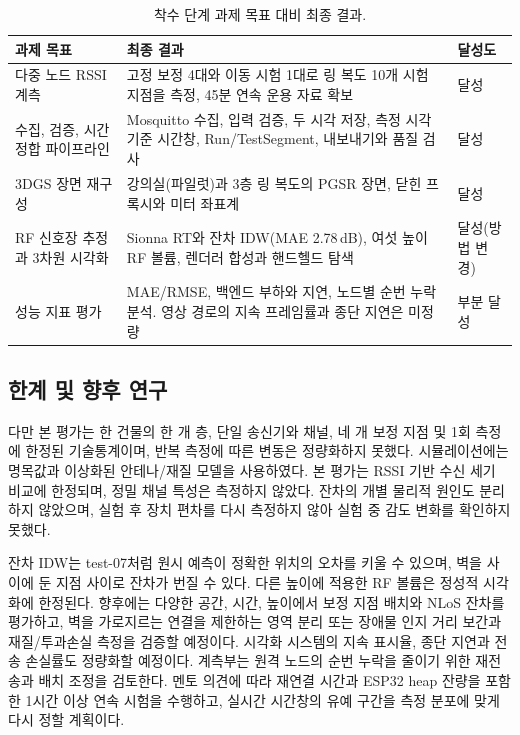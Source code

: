 \documentclass[11pt,a4paper]{article}
\begin{document}
\begin{table}[htbp]
  \centering\small
  \caption{착수 단계 과제 목표 대비 최종 결과.}
  \label{tab:goals}
  \renewcommand{\arraystretch}{1.2}
  \begin{tabularx}{\textwidth}{@{}>{\raggedright\arraybackslash}p{3.6cm}
    >{\raggedright\arraybackslash}X >{\centering\arraybackslash}p{1.5cm}@{}}
    \toprule
    과제 목표 & 최종 결과 & 달성도 \\
    \midrule
    다중 노드 RSSI 계측 & 고정 보정 4대와 이동 시험 1대로 링 복도 10개 시험 지점을 측정, 45분 연속 운용 자료 확보 & 달성 \\
    수집, 검증, 시간 정합 파이프라인 & Mosquitto 수집, 입력 검증, 두 시각 저장, 측정 시각 기준 시간창, Run/TestSegment, 내보내기와 품질 검사 & 달성 \\
    3DGS 장면 재구성 & 강의실(파일럿)과 3층 링 복도의 PGSR 장면, 닫힌 프록시와 미터 좌표계 & 달성 \\
    RF 신호장 추정과 3차원 시각화 & Sionna RT와 잔차 IDW(MAE 2.78\,dB), 여섯 높이 RF 볼륨, 렌더러 합성과 핸드헬드 탐색 & 달성(방법 변경) \\
    성능 지표 평가 & MAE/RMSE, 백엔드 부하와 지연, 노드별 순번 누락 분석. 영상 경로의 지속 프레임률과 종단 지연은 미정량 & 부분 달성 \\
    \bottomrule
  \end{tabularx}
\end{table}

\subsection{한계 및 향후 연구}

다만 본 평가는 한 건물의 한 개 층, 단일 송신기와 채널, 네 개 보정 지점 및 1회 측정에 한정된 기술통계이며, 반복 측정에 따른 변동은 정량화하지 못했다. 시뮬레이션에는
명목값과 이상화된 안테나/재질 모델을 사용하였다. 본 평가는 RSSI 기반 수신 세기 비교에 한정되며, 정밀 채널 특성은 측정하지 않았다. 잔차의 개별 물리적 원인도 분리하지
않았으며, 실험 후 장치 편차를 다시 측정하지 않아 실험 중 감도 변화를 확인하지 못했다.

잔차 IDW는 test-07처럼 원시 예측이 정확한 위치의 오차를 키울 수 있으며, 벽을 사이에 둔 지점 사이로 잔차가 번질 수 있다. 다른 높이에 적용한 RF 볼륨은 정성적
시각화에 한정된다. 향후에는 다양한 공간, 시간, 높이에서 보정 지점 배치와 NLoS 잔차를 평가하고, 벽을 가로지르는 연결을 제한하는 영역 분리 또는 장애물 인지 거리 보간과
재질/투과손실 측정을 검증할 예정이다. 시각화 시스템의 지속 표시율, 종단 지연과 전송 손실률도 정량화할 예정이다.
계측부는 원격 노드의 순번 누락을 줄이기 위한 재전송과 배치 조정을 검토한다. 멘토 의견에 따라 재연결 시간과 ESP32 heap
잔량을 포함한 1시간 이상 연속 시험을 수행하고, 실시간 시간창의 유예 구간을 측정 분포에 맞게 다시 정할 계획이다.
\end{document}
